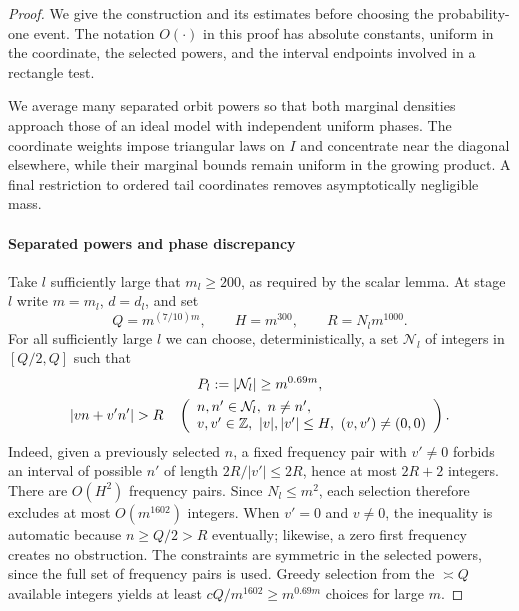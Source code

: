 \begin{proof}
We give the construction and its estimates before choosing the
probability-one event.  The notation $O(\cdot)$ in this proof has
absolute constants, uniform in the coordinate, the selected powers,
and the interval endpoints involved in a rectangle test.

We average many separated orbit powers so that both marginal densities
approach those of an ideal model with independent uniform phases.  The
coordinate weights impose triangular laws on $I$ and concentrate near
the diagonal elsewhere, while their marginal bounds remain uniform in
the growing product.  A final restriction to ordered tail coordinates
removes asymptotically negligible mass.

\paragraph{Separated powers and phase discrepancy}

Take $l$ sufficiently large that $m_l\ge200$, as required by the scalar
lemma. At stage $l$ write $m=m_l$, $d=d_l$, and set
\[
 Q=m^{(7/10)m},\qquad H=m^{300},\qquad R=N_lm^{1000}.
\]
For all sufficiently large $l$ we can choose, deterministically, a
set $\mathcal N_l$ of integers in $[Q/2,Q]$ such that
\begin{equation}\label{p:eq:sampling-separation}
 \begin{gathered}
 P_l:=|\mathcal N_l|\ge m^{0.69m},\\
 |vn+v'n'|>R\quad
 \left(\begin{array}{l}
 n,n'\in\mathcal N_l,\ n\ne n',\\
 v,v'\in\Z,\ |v|,|v'|\le H,\ (v,v')\ne(0,0)
 \end{array}\right).
 \end{gathered}
\end{equation}
Indeed, given a previously selected $n$, a fixed frequency pair with
$v'\ne0$ forbids an interval of possible $n'$ of length
$2R/|v'|\le2R$, hence at most $2R+2$ integers.  There are
$O(H^2)$ frequency pairs.  Since $N_l\le m^2$, each selection
therefore excludes at most $O(m^{1602})$ integers.  When $v'=0$
and $v\ne0$, the inequality is automatic because $n\ge Q/2>R$
eventually; likewise, a zero first frequency creates no obstruction.
The constraints are symmetric in the selected powers, since the
full set of frequency pairs is used.  Greedy selection from the
$\asymp Q$ available integers yields at least
$cQ/m^{1602}\ge m^{0.69m}$ choices for large $m$.


\end{proof}
